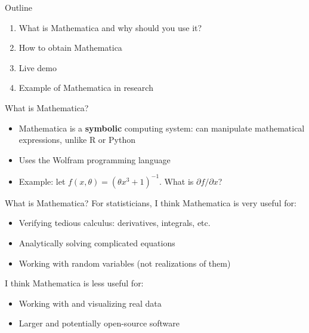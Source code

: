 \documentclass[dvipsnames, handout]{beamer}
\newcommand{\1}{\mathds{1}}	%
\begin{document}

\title{}
\author{\textbf{Cornell Statistics Graduate Society}\\Sara Venkatraman}
\date{}

\begin{frame}
\vspace{1.2cm}\titlepage
\end{frame}


\begin{frame}{Outline}
\begin{enumerate}
\item What is Mathematica and why should you use it?
\item How to obtain Mathematica
\item Live demo
\item Example of Mathematica in research
\end{enumerate}
\end{frame}

\begin{frame}{What is Mathematica?}
\begin{itemize}
\item Mathematica is a \textbf{symbolic} computing system: can manipulate mathematical expressions, unlike R or Python
\item Uses the Wolfram programming language
\item Example: let $f(x,\theta) = (\theta x^3 + 1)^{-1}$. What is $\partial f/\partial x$?
\end{itemize}
\begin{figure}[H]
\centering{}	
\end{figure}
\end{frame}

\begin{frame}{What is Mathematica?}
For statisticians, I think Mathematica is very useful for:	
\begin{itemize}
\item Verifying tedious calculus: derivatives, integrals, etc.
\item Analytically solving complicated equations
\item Working with random variables {\scriptsize (not realizations of them)}
\end{itemize}\vspace{.5cm}

I think Mathematica is less useful for:
\begin{itemize}
\item Working with and visualizing real data	
\item Larger and potentially open-source software
\end{itemize}
\end{frame}
\end{document}
